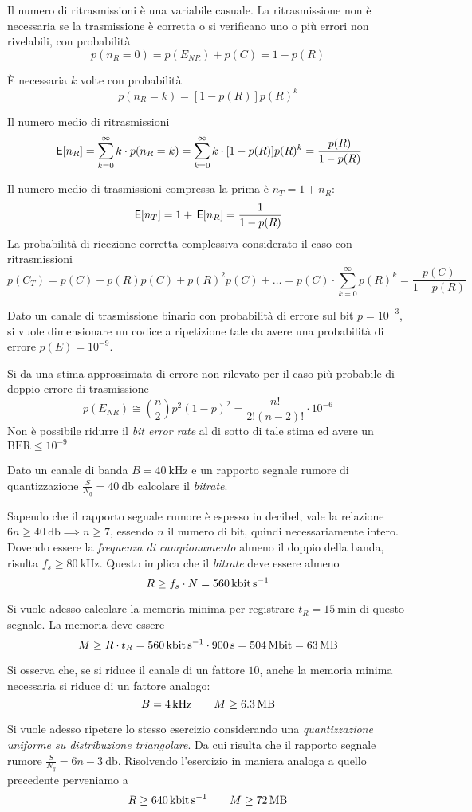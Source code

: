 Il numero di ritrasmissioni è una variabile casuale.
La ritrasmissione non è necessaria se la trasmissione è corretta o si verificano uno o più errori non rivelabili, con probabilità \[p(n_R=0)=p(E_{NR})+p(C)=1-p(R)\]

\`{E} necessaria $k$ volte con probabilità \[p(n_R=k)=[1-p(R)]p(R)^k\]

Il numero medio di ritrasmissioni
\[\,{\operatorname{\mathsf{E}}}\!\left[{n_R}\right]=\sum_{k=0}^{\infty}k\cdot p(n_R=k)=\sum_{k=0}^{\infty}k\cdot[1-p(R)]p(R)^k=\frac{p(R)}{1-p(R)}\]

Il numero medio di trasmissioni compressa la prima è $n_T=1+n_R$:
\[\,{\operatorname{\mathsf{E}}}\!\left[{n_T}\right]=1+\,{\operatorname{\mathsf{E}}}\!\left[{n_R}\right]=\frac{1}{1-p(R)}\]
La probabilità di ricezione corretta complessiva considerato il caso con ritrasmissioni
\[p(C_T)=p(C)+p(R)p(C)+p(R)^2p(C)+\dots=p(C)\cdot\sum_{k=0}^{\infty}p(R)^k=\frac{p(C)}{1-p(R)}\]

\begin{esempio}
Dato un canale di trasmissione binario con probabilità di errore sul bit $p=10^{-3}$, si vuole dimensionare un codice a ripetizione tale da avere una probabilità di errore $p(E)=10^{-9}$.

Si da una stima approssimata di errore non rilevato per il caso più probabile di doppio errore di trasmissione
\[p(E_{NR})\cong\binom{n}{2}p^2(1-p)^2=\frac{n!}{2!(n-2)!}\cdot 10^{-6}\]
Non è possibile ridurre il \emph{bit error rate} al di sotto di tale stima ed avere un $\text{BER}\leq 10^{-9}$
\end{esempio}

\begin{esercizio}
Dato un canale di banda $B = \SI{40}{\kHz}$ e un rapporto segnale rumore di quantizzazione $\frac{S}{N_q} = \SI{40}{\decibel}$ calcolare il \emph{bitrate}.

Sapendo che il rapporto segnale rumore è espesso in decibel, vale la relazione $6n \geq \SI{40}{\decibel} \implies n \geq 7$, essendo $n$ il numero di bit, quindi necessariamente intero. Dovendo essere la \emph{frequenza di campionamento} almeno il doppio della banda, risulta $f_s \geq \SI{80}{\kHz}$. Questo implica che il \emph{bitrate} deve essere almeno $$R \geq f_s \cdot N = \SI{560}{\kilo\bit\per\second}$$

Si vuole adesso calcolare la memoria minima per registrare $t_R = \SI{15}{\minute}$ di questo segnale. La memoria deve essere $$M \geq R \cdot t_R = \SI{560}{\kilo\bit\per\second} \cdot \SI{900}{\second} = \SI{504}{\mega\bit} = \SI{63}{\mega\byte}$$

Si osserva che, se si riduce il canale di un fattore $10$, anche la memoria minima necessaria si riduce di un fattore analogo: $$B=\SI{4}{\kHz} \qquad M\geq\SI{6,3}{\mega\byte}$$

Si vuole adesso ripetere lo stesso esercizio considerando una \emph{quantizzazione uniforme su distribuzione triangolare}. Da cui risulta che il rapporto segnale rumore $\frac{S}{N_q} = 6n-\SI{3}{\decibel}$. Risolvendo l'esercizio in maniera analoga a quello precedente perveniamo a $$R \geq \SI{640}{\kilo\bit\per\second} \qquad M \geq \SI{72}{\mega\byte}$$
\end{esercizio}

